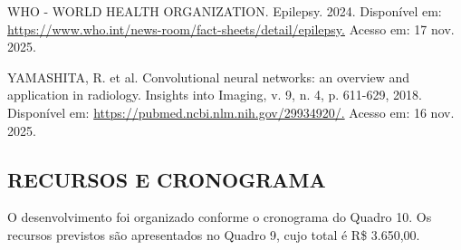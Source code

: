 \begin{SingleSpace}
{\raggedright\setlength{\parindent}{0pt} WHO - WORLD HEALTH ORGANIZATION. Epilepsy. 2024. Disponível em: \url{https://www.who.int/news-room/fact-sheets/detail/epilepsy.} Acesso em: 17 nov. 2025.\par}\smallskip

{\raggedright\setlength{\parindent}{0pt} YAMASHITA, R. et al. Convolutional neural networks: an overview and application in radiology. Insights into Imaging, v. 9, n. 4, p. 611-629, 2018. Disponível em: \url{https://pubmed.ncbi.nlm.nih.gov/29934920/.} Acesso em: 16 nov. 2025.\par}\smallskip

\end{SingleSpace}\begin{apendicesenv}\chapter{RECURSOS E CRONOGRAMA}
O desenvolvimento foi organizado conforme o cronograma do Quadro 10. Os recursos previstos são apresentados no Quadro 9, cujo total é R\$ 3.650,00.


\end{apendicesenv}
